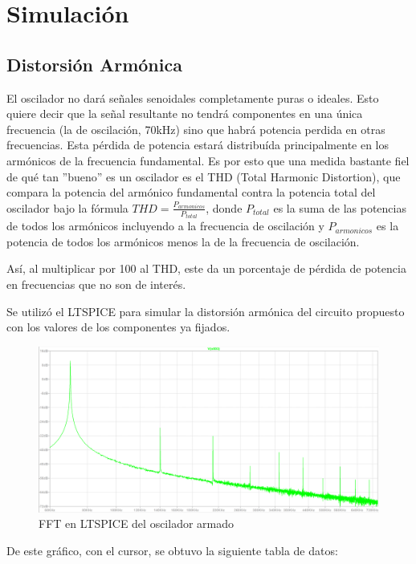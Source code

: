 \documentclass[../../tc_tp6_main.tex]{subfiles}
\begin{document}
\section{Simulación}

\subsection{Distorsión Armónica}

El oscilador no dará señales senoidales completamente puras o ideales. Esto quiere decir que la señal resultante no tendrá componentes en una única frecuencia (la de oscilación, 70kHz) sino que habrá potencia perdida en otras frecuencias. Esta pérdida de potencia estará distribuída principalmente en los armónicos de la frecuencia fundamental. Es por esto que una medida bastante fiel de qué tan ''bueno'' es un oscilador es el THD (Total Harmonic Distortion), que compara la potencia del armónico fundamental contra la potencia total del oscilador bajo la fórmula $THD = \frac{P_{armonicos}}{P_{total}}$, donde $P_{total}$ es la suma de las potencias de todos los armónicos incluyendo a la frecuencia de oscilación y $P_{armonicos}$ es la potencia de todos los armónicos menos la de la frecuencia de oscilación.\par
Así, al multiplicar por 100 al THD, este da un porcentaje de pérdida de potencia en frecuencias que no son de interés.\par
Se utilizó el LTSPICE para simular la distorsión armónica del circuito propuesto con los valores de los componentes ya fijados. 

\begin{figure}[H]	
	\centering
	\includegraphics[scale=0.5]{imagenes/thd_simulado.png}
	\caption{FFT en LTSPICE del oscilador armado}
	\label{fig:ej1_thd_simulado}
\end{figure}

De este gráfico, con el cursor, se obtuvo la siguiente tabla de datos: 
\end{document}
